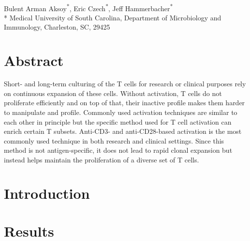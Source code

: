 \documentclass[10pt,letterpaper]{article}
\begin{document}
\vspace*{0.35in}

\begin{flushleft}
{\Large
\textbf{}
}
\newline
\\
Bulent Arman Aksoy\textsuperscript{*},
Eric Czech\textsuperscript{*},
Jeff Hammerbacher\textsuperscript{*}
\\
\bigskip
{*} Medical University of South Carolina,
       Department of Microbiology and Immunology,
       Charleston, SC, 29425
\end{flushleft}

\section*{Abstract}
Short- and long-term culturing of the T cells for research or clinical purposes rely on continuous expansion of these cells.
Without activation, T cells do not proliferate efficiently and on top of that, their inactive profile makes them harder to manipulate and profile.
Commonly used activation techniques are similar to each other in principle but the specific method used for T cell activation can enrich certain T subsets.
Anti-CD3- and anti-CD28-based activation is the most commonly used technique in both research and clinical settings.
Since this method is not antigen-specific, it does not lead to rapid clonal expansion but instead helps maintain the proliferation of a diverse set of T cells.

\linenumbers

\section*{Introduction}


\section*{Results}
\end{document}
